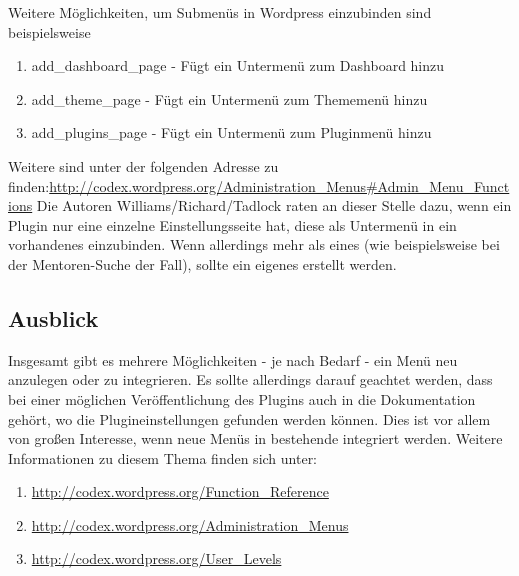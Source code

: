 Weitere Möglichkeiten, um Submenüs in Wordpress einzubinden sind beispielsweise
\begin{enumerate}
\item add\_dashboard\_page - Fügt ein Untermenü zum Dashboard hinzu
\item add\_theme\_page - Fügt ein Untermenü zum Thememenü hinzu
\item add\_plugins\_page - Fügt ein Untermenü zum Pluginmenü hinzu
\end{enumerate}
Weitere sind unter der folgenden Adresse zu finden:\url{http://codex.wordpress.org/Administration\_Menus#Admin\_Menu\_Functions}\newline
Die Autoren Williams/Richard/Tadlock raten an dieser Stelle dazu, wenn ein Plugin nur eine einzelne Einstellungsseite hat, diese als Untermenü in ein vorhandenes einzubinden. Wenn allerdings mehr als eines (wie beispielsweise bei der Mentoren-Suche der Fall), sollte ein eigenes erstellt werden.
\subsection{Ausblick} 
Insgesamt gibt es mehrere Möglichkeiten - je nach Bedarf - ein Menü neu anzulegen oder zu integrieren. \newline
Es sollte allerdings darauf geachtet werden, dass bei einer möglichen Veröffentlichung des Plugins auch in die Dokumentation gehört, wo die Plugineinstellungen gefunden werden können. Dies ist vor allem von großen Interesse, wenn neue Menüs in bestehende integriert werden.
Weitere Informationen zu diesem Thema finden sich unter:
\begin{enumerate}
	\item \url{http://codex.wordpress.org/Function\_Reference} 	\item \url{http://codex.wordpress.org/Administration\_Menus}
	\item	\url{http://codex.wordpress.org/User\_Levels}
\end{enumerate}